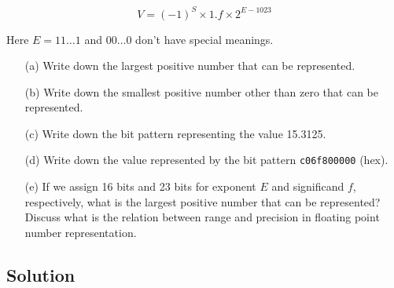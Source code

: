 \documentclass{article}
\begin{document}
\[
    V = (-1)^{S} \times 1.f \times 2^{E - 1023}
\]

Here $E = 11 \ldots 1$ and $00 \ldots 0$ don’t have special meanings.

\begin{enumerate}
    \item[(a)] Write down the largest positive number that can be represented.
    \item[(b)] Write down the smallest positive number other than zero that can be represented.
    \item[(c)] Write down the bit pattern representing the value 15.3125.
    \item[(d)] Write down the value represented by the bit pattern \texttt{c06f800000} (hex).
    \item[(e)] If we assign 16 bits and 23 bits for exponent $E$ and significand $f$, respectively, what is the largest positive number that can be represented? Discuss what is the relation between range and precision in floating point number representation.
\end{enumerate}

\subsection*{Solution}
\end{document}
